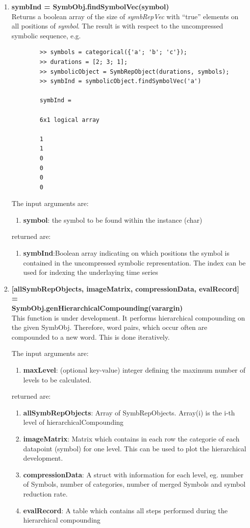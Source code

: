 \documentclass[a4]{scrreprt}
\begin{document}
\begin{enumerate}
	\item \textbf{symbInd = SymbObj.findSymbolVec(symbol)}\\
		Returns a boolean array of the size of \textit{symbRepVec} with ``true'' elements on all positions of \textit{symbol}. The result is with respect to the uncompressed symbolic sequence, e.g.
		\begin{verbatim}
		>> symbols = categorical({'a'; 'b'; 'c'});
		>> durations = [2; 3; 1];
		>> symbolicObject = SymbRepObject(durations, symbols);
		>> symbInd = symbolicObject.findSymbolVec('a')
		
		symbInd =
		
		6x1 logical array
		
		1
		1
		0
		0
		0
		0
		\end{verbatim}
		
		The input arguments are:
		\begin{enumerate}
			\item \textbf{symbol}: the symbol to be found within the instance (char)
		\end{enumerate}
		returned are:
		\begin{enumerate}
			\item \textbf{symbInd}:Boolean array indicating on which positions the symbol is contained in the uncompressed symbolic representation. The index can be used for indexing the underlaying time series
		\end{enumerate}
	
	\item \textbf{[allSymbRepObjects, imageMatrix, compressionData, evalRecord] = \\SymbObj.genHierarchicalCompounding(varargin)}\\
		This function is under development. It performs hierarchical compounding on the given SymbObj. Therefore, word pairs, which occur often are compounded to a new word. This is done iteratively.
	
				The input arguments are:
		\begin{enumerate}
			\item \textbf{maxLevel}: (optional key-value) integer defining the maximum number of levels to be calculated.
		\end{enumerate}
		returned are:
		\begin{enumerate}
			\item \textbf{allSymbRepObjects}: Array of SymbRepObjects. Array(i) is the i-th level of hierarchicalCompounding
			\item \textbf{imageMatrix}: Matrix which contains in each row the categorie of each datapoint (symbol) for one level. This can be used to plot the hierarchical development.
			\item \textbf{compressionData}: A struct with information for each level, eg. number of Symbols, number of categories, number of merged Symbols and symbol reduction rate.
			\item \textbf{evalRecord}: A table which contains all steps performed during the hierarchical compounding
		\end{enumerate}


\end{enumerate}
\end{document}
